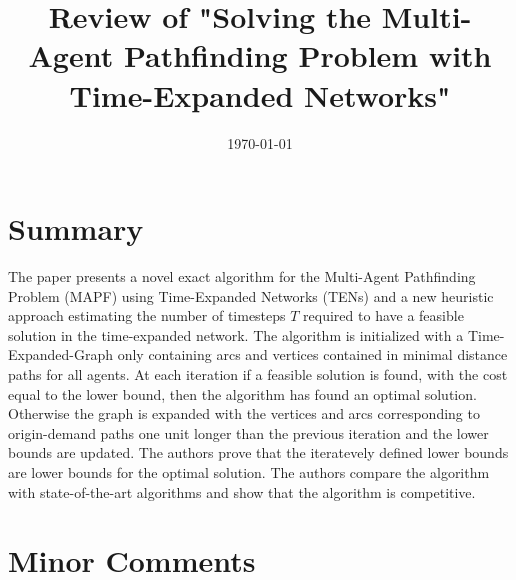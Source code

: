\documentclass{article}
\begin{document}
\title{Review of "Solving the Multi-Agent Pathfinding Problem with Time-Expanded Networks"}
\date{\today}

\maketitle

\section*{Summary}

The paper presents a novel exact algorithm for the Multi-Agent Pathfinding Problem (MAPF) using Time-Expanded Networks (TENs) and a new heuristic approach estimating the number of timesteps \(T\) required to have a feasible solution in the time-expanded network.
%
The algorithm is initialized with a Time-Expanded-Graph only containing arcs and vertices contained in minimal distance paths for all agents.
%
At each iteration if a feasible solution is found, with the cost equal to the lower bound, then the algorithm has found an optimal solution. 
Otherwise the graph is expanded with the vertices and arcs corresponding to origin-demand paths one unit longer than the previous iteration and the lower bounds are updated.
The authors prove that the iteratevely defined lower bounds are lower bounds for the optimal solution. The authors compare the algorithm with state-of-the-art algorithms and show that the algorithm is competitive.

\section*{Minor Comments}
\end{document}
